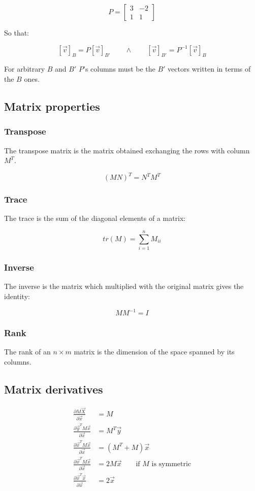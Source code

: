 		$$P = \begin{bmatrix} 3 & -2 \\ 1 & 1 \end{bmatrix}$$

		So that:

		$$[\vec{v}]_B = P[\vec{v}]_{B'}\qquad\land\qquad [\vec{v}]_{B'} = P^{-1}[\vec{v}]_B$$

		For arbitrary $B$ and $B'$ $P$'s columns must be the $B'$ vectors written in terms of the $B$ ones.

	\subsection{Matrix properties}

		\subsubsection{Transpose}
		The transpose matrix is the matrix obtained exchanging the rows with column $M^T$.

		$$(MN)^T = N^TM^T$$

		\subsubsection{Trace}
		The trace is the sum of the diagonal elements of a matrix:

		$$tr(M) = \sum\limits_{i = 1}^n M_{ii}$$

		\subsubsection{Inverse}
		The inverse is the matrix which multiplied with the original matrix gives the identity:

		$$MM^{-1} = I$$

		\subsubsection{Rank}
		The rank of an $n\times m$ matrix is the dimension of the space spanned by its columns.

	\subsection{Matrix derivatives}

	\begin{align*}
		\frac{\partial M\vec{X}}{\partial \vec{x}} &= M\\
		\frac{\partial \vec{y}^T M\vec{x}}{\partial \vec{x}} &=M^T\vec{y}\\
		\frac{\partial \vec{x}^T M\vec{x}}{\partial \vec{x}} &= (M^T + M)\vec{x}\\
		\frac{\partial \vec{x}^T M\vec{x}}{\partial \vec{x}} &= 2M\vec{x} \qquad \text{if }M\text{ is symmetric}\\
		\frac{\partial \vec{x}^T \vec{x}}{\partial \vec{x}} &= 2\vec{x}
	\end{align*}

